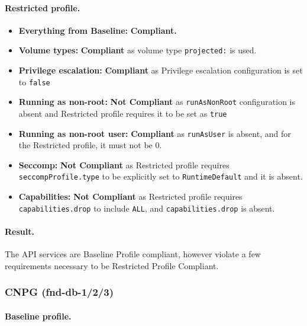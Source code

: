 \documentclass[11pt,a4paper]{article}
\begin{document}
	\paragraph{Restricted profile.}
	
	\begin{itemize}
		\item \textbf{Everything from Baseline:} \textbf{Compliant.}
		
		\item \textbf{Volume types:} \textbf{Compliant} as volume type \texttt{projected:} is used. 
		
		\item \textbf{Privilege escalation:} \textbf{Compliant} as Privilege escalation configuration is set to \texttt{false} 
		
		\item \textbf{Running as non-root:} \textbf{Not Compliant} as \texttt{runAsNonRoot} configuration is absent and Restricted profile requires it to be set as \texttt{true}
		
		\item \textbf{Running as non-root user:} \textbf{Compliant} as \texttt{runAsUser} is absent, and for the Restricted profile, it must not be 0.
		
		\item \textbf{Seccomp:} \textbf{Not Compliant} as Restricted profile requires \texttt{seccompProfile.type} to be explicitly set to \texttt{RuntimeDefault} and it is absent. 
		
		\item \textbf{Capabilities:} \textbf{Not Compliant} as Restricted profile requires \texttt{capabilities.drop} to include \texttt{ALL}, and \texttt{capabilities.drop} is absent. 
	\end{itemize}
	
	\paragraph{Result.}
	The API services are Baseline Profile compliant, however violate a few requirements necessary to be Restricted Profile Compliant.
	
	\subsubsection{CNPG (fnd-db-1/2/3)}
	
	\paragraph{Baseline profile.}
	
\end{document}
